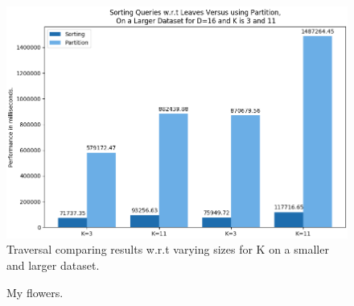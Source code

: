 \begin{figure}[H]
\centering
\includegraphics[width=1\textwidth]{pics/plot-figs/sort-d16.png}
\caption{Traversal comparing results w.r.t varying sizes for K on a smaller and larger dataset.}
\end{figure}

\begin{figure}[!tbp]
  \centering
  \caption{My flowers.}
\end{figure}






